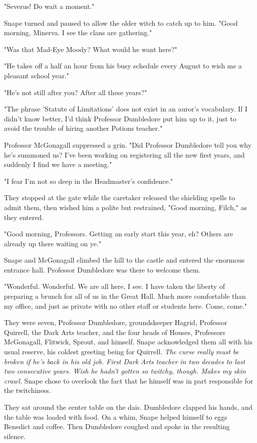 \documentclass[a4paper,11pt]{article}
\begin{document}
"Severus! Do wait a moment."

Snape turned and paused to allow the older witch to catch up to him. "Good morning, Minerva. I see the clans are gathering."

"Was that Mad-Eye Moody? What would he want here?"

"He takes off a half an hour from his busy schedule every August to wish me a pleasant school year."

"He's not still after you? After all these years?"

"The phrase 'Statute of Limitations' does not exist in an auror's vocabulary. If I didn't know better, I'd think Professor Dumbledore put him up to it, just to avoid the trouble of hiring another Potions teacher."

Professor McGonagall suppressed a grin. "Did Professor Dumbledore tell you why he's summoned us? I've been working on registering all the new first years, and suddenly I find we have a meeting."

"I fear I'm not so deep in the Headmaster's confidence."

They stopped at the gate while the caretaker released the shielding spells to admit them, then wished him a polite but restrained, "Good morning, Filch," as they entered.

"Good morning, Professors. Getting an early start this year, eh? Others are already up there waiting on ye."

Snape and McGonagall climbed the hill to the castle and entered the enormous entrance hall. Professor Dumbledore was there to welcome them.

"Wonderful. Wonderful. We are all here, I see. I have taken the liberty of preparing a brunch for all of us in the Great Hall. Much more comfortable than my office, and just as private with no other staff or students here. Come, come."

They were seven, Professor Dumbledore, groundskeeper Hagrid, Professor Quirrell, the Dark Arts teacher, and the four heads of Houses, Professors McGonagall, Flitwick, Sprout, and himself. Snape acknowledged them all with his usual reserve, his coldest greeting being for Quirrell. \emph{The curse really must be broken if he's back in his old job. First Dark Arts teacher in two decades to last two consecutive years. Wish he hadn't gotten so twitchy, though. Makes my skin crawl.} Snape chose to overlook the fact that he himself was in part responsible for the twitchiness.

They sat around the center table on the dais. Dumbledore clapped his hands, and the table was loaded with food. On a whim, Snape helped himself to eggs Benedict and coffee. Then Dumbledore coughed and spoke in the resulting silence.
\end{document}
